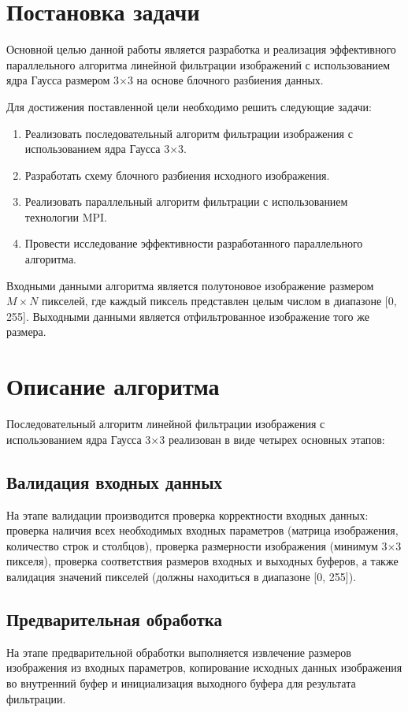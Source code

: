 \documentclass[14pt]{extarticle}
\theoremstyle{definition}
\theoremstyle{remark}
\begin{document}
\newpage

\section{Постановка задачи}
Основной целью данной работы является разработка и реализация эффективного параллельного алгоритма линейной фильтрации изображений с использованием ядра Гаусса размером 3×3 на основе блочного разбиения данных.

Для достижения поставленной цели необходимо решить следующие задачи:

\begin{enumerate}
    \item Реализовать последовательный алгоритм фильтрации изображения с использованием ядра Гаусса 3×3.

    \item Разработать схему блочного разбиения исходного изображения.

    \item Реализовать параллельный алгоритм фильтрации с использованием технологии MPI.

    \item Провести исследование эффективности разработанного параллельного алгоритма.
\end{enumerate}
Входными данными алгоритма является полутоновое изображение размером $M \times N$ пикселей, где каждый пиксель представлен целым числом в диапазоне [0, 255]. Выходными данными является отфильтрованное изображение того же размера.
\clearpage
\section{Описание алгоритма}

Последовательный алгоритм линейной фильтрации изображения с использованием ядра Гаусса 3×3 реализован в виде четырех основных этапов:

\subsection{Валидация входных данных}
На этапе валидации производится проверка корректности входных данных:
проверка наличия всех необходимых входных параметров (матрица изображения, количество строк и столбцов), проверка размерности изображения (минимум 3×3 пикселя), проверка соответствия размеров входных и выходных буферов, а также валидация значений пикселей (должны находиться в диапазоне [0, 255]).

\subsection{Предварительная обработка}
На этапе предварительной обработки выполняется извлечение размеров изображения из входных параметров, копирование исходных данных изображения во внутренний буфер и инициализация выходного буфера для результата фильтрации.
\end{document}
